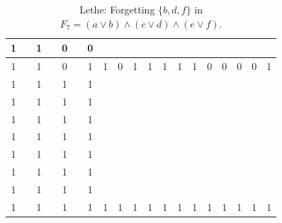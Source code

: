 \begin{table}[!tb]
\begin{tabular}{|c|c|c|c|c|c|c|c|c|c|c|c|c|c|c|c|c|c|c|}
        \rowcolor{blue!40} 1 &  & 1 &  & 0 &  & 0 &  &  &  &  &  &  &  &  &  &  &  &  \\ \hline
        \rowcolor{blue!40} 1 &  & 1 &  & 0 &  & 1 & 1 & 0 & 1 & 1 & 1 & 1 & 1 & 0 & 0 & 0 & 0 & 1 \\ \hline
        \rowcolor{red!40} 1 &  & 1 &  & 1 &  & 1 &  &  &  &  &  &  &  &  &  &  &  &  \\ \hline
        \rowcolor{red!40} 1 &  & 1 &  & 1 &  & 1 &  &  &  &  &  &  &  &  &  &  &  &  \\ \hline
        \rowcolor{red!40} 1 &  & 1 &  & 1 &  & 1 &  &  &  &  &  &  &  &  &  &  &  &  \\ \hline
        \rowcolor{red!40} 1 &  & 1 &  & 1 &  & 1 &  &  &  &  &  &  &  &  &  &  &  &  \\ \hline
        \rowcolor{red!40} 1 &  & 1 &  & 1 &  & 1 &  &  &  &  &  &  &  &  &  &  &  &  \\ \hline
        \rowcolor{red!40} 1 &  & 1 &  & 1 &  & 1 &  &  &  &  &  &  &  &  &  &  &  &  \\ \hline
        \rowcolor{red!40} 1 &  & 1 &  & 1 &  & 1 &  &  &  &  &  &  &  &  &  &  &  &  \\ \hline
        \rowcolor{red!40} 1 &  & 1 &  & 1 &  & 1 & 1 & 1 & 1 & 1 & 1 & 1 & 1 & 1 & 1 & 1 & 1 & 1 \\ \hline
    \end{tabular}
    \caption{Lethe: Forgetting $\{b, d, f\}$ in $F_{7} = (a \lor b) \land (c \lor d) \land (e \lor f)$.}
    \label{tab:lethe-F7-bdf}
\end{table}

